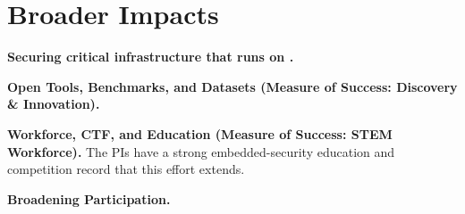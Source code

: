 \section{Broader Impacts}
\label{sec:bi}


\textbf{Securing critical infrastructure that runs on \ose{}.}

\textbf{Open Tools, Benchmarks, and Datasets (Measure of Success: Discovery \& Innovation).}

\textbf{Workforce, CTF, and Education (Measure of Success: STEM Workforce).}
The PIs have a strong embedded-security education and competition record that this effort extends.

\textbf{Broadening Participation.}
